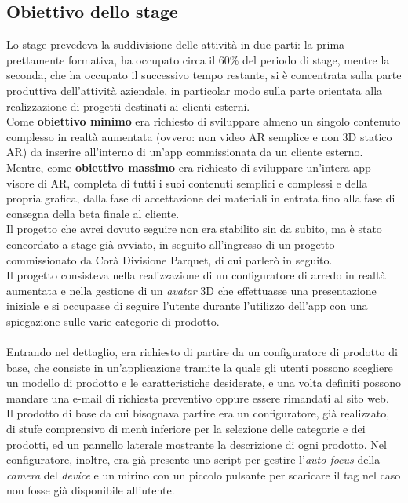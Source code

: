 \subsection{Obiettivo dello stage}
Lo stage prevedeva la suddivisione delle attivit\`a in due parti: la prima prettamente formativa, ha occupato circa il 60\% del periodo di stage, mentre la seconda, che ha occupato il successivo tempo restante, si \`e concentrata sulla parte produttiva dell’attività aziendale, in particolar modo sulla parte orientata alla realizzazione di progetti destinati ai clienti esterni.
\\
Come \textbf{obiettivo minimo} era richiesto di sviluppare almeno un singolo contenuto complesso in realtà aumentata (ovvero: non video AR semplice e non 3D statico AR) da inserire all’interno di un’app commissionata da un cliente esterno. 
\\
Mentre, come \textbf{obiettivo massimo} era richiesto di sviluppare un’intera app visore di AR, completa di tutti i suoi contenuti semplici e complessi e della propria grafica, dalla fase di accettazione dei materiali in entrata fino alla fase di consegna della beta finale al cliente.
\\
Il progetto che avrei dovuto seguire non era stabilito sin da subito, ma \`e stato concordato a stage gi\`a avviato, in seguito all'ingresso di un progetto commissionato da Cor\`a Divisione Parquet, di cui parler\`o in seguito.
\\
Il progetto consisteva nella realizzazione di un configuratore di arredo in realt\`a aumentata e nella gestione di un \textit{avatar\gloss} 3D che effettuasse una presentazione iniziale e si occupasse di seguire l'utente durante l'utilizzo dell'app con una spiegazione sulle varie categorie di prodotto.
\\\\
Entrando nel dettaglio, era richiesto di partire da un configuratore di prodotto di base, che consiste in un'applicazione tramite la quale gli utenti possono scegliere un modello di prodotto e le caratteristiche desiderate, e una volta definiti possono mandare una e-mail di richiesta preventivo oppure essere rimandati al sito web. 
\\
Il prodotto di base da cui bisognava partire era un configuratore, gi\`a realizzato, di stufe comprensivo di men\`u inferiore per la selezione delle categorie e dei prodotti, ed un pannello laterale mostrante la descrizione di ogni prodotto. Nel configuratore, inoltre, era gi\`a presente uno script per gestire l'\textit{auto-focus} della \textit{camera} del \textit{device} e un mirino con un piccolo pulsante per scaricare il tag nel caso non fosse gi\`a disponibile all'utente.
